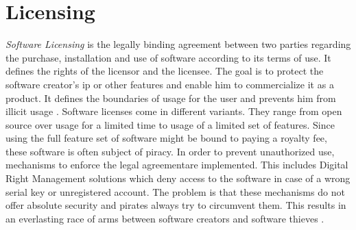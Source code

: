 \section{Licensing} \label{subsection:introduction-licensing}
\textit{Software Licensing} is the legally binding agreement between two parties regarding the purchase, installation and use of software according to its terms of use.
It defines the rights of the licensor and the licensee.
The goal is to protect the software creator's \gls{ip} or other features and enable him to commercialize it as a product.
It defines the boundaries of usage for the user and prevents him from illicit usage \cite{uncgLicensing}.
\newline
\newline
Software licenses come in different variants.
They range from open source over usage for a limited time to usage of a limited set of features.
Since using the full feature set of software might be bound to paying a royalty fee, these software is often subject of piracy.
In order to prevent unauthorized use, mechanisms to enforce the legal agreementare implemented.
This includes Digital Right Management solutions which deny access to the software in case of a wrong serial key or unregistered account.
\newline
\newline
The problem is that these mechanisms do not offer absolute security and pirates always try to circumvent them.
This results in an everlasting race of arms between software creators and software thieves \cite{szCopy}.
